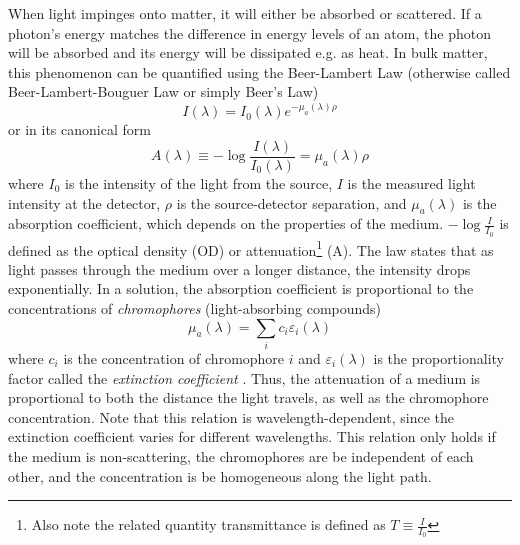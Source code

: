 When light impinges onto matter, it will either be absorbed or scattered. If a photon's energy matches the difference in energy levels of an atom, the photon will be absorbed and its energy will be dissipated e.g. as heat. In bulk matter, this phenomenon can be quantified using the Beer-Lambert Law (otherwise called Beer-Lambert-Bouguer Law or simply Beer's Law)
\begin{equation} \label{eq:beer-lambert}
I(\lambda) = I_0(\lambda)e^{-\mu_a(\lambda) \rho}
\end{equation}
or in its canonical form
\begin{equation}
A(\lambda) \equiv -\log\frac{I(\lambda)}{I_0(\lambda)} = \mu_a(\lambda)\rho
\end{equation}
where $I_0$ is the intensity of the light from the source, $I$ is the measured light intensity at the detector, $\rho$ is the source-detector separation, and $\mu_a(\lambda)$ is the absorption coefficient, which depends on the properties of the medium. $-\log\frac{I}{I_0}$ is defined as the optical density (OD) or attenuation\footnote{Also note the related quantity transmittance is defined as $T \equiv \frac{I}{I_0}$} (A). The law states that as light passes through the medium over a longer distance, the intensity drops exponentially. In a solution, the absorption coefficient is proportional to the concentrations of \emph{chromophores} (light-absorbing compounds)
\begin{equation} \label{eq:muA_sum_chromo}
\mu_a(\lambda) = \sum_i c_i \varepsilon_i(\lambda)
\end{equation}
where $c_i$ is the concentration of chromophore $i$ and $\varepsilon_i(\lambda)$ is the proportionality factor called the \emph{extinction coefficient} \cite[ch. 8.2.1]{Handbook}. Thus, the attenuation of a medium is proportional to both the distance the light travels, as well as the chromophore concentration. Note that this relation is wavelength-dependent, since the extinction coefficient varies for different wavelengths. This relation only holds if the medium is non-scattering, the chromophores  are be independent of each other, and the concentration is be homogeneous along the light path. \cite[ch. 2]{Madsen2013}


